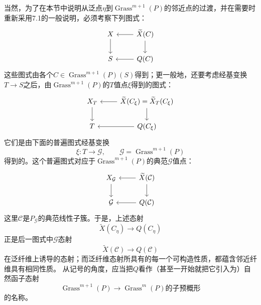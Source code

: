 当然，为了在本节中说明从泛点$\eta$到$\operatorname{Grass}^{m+1}(P)$的邻近点的过渡，并在需要时重新采用7.1的一般说明，必须考察下列图式：
\[
\begin{tikzcd}
X \arrow[d] & \widetilde X(C) \arrow[l] \arrow[d] \\
S & Q(C) \arrow[l]
\end{tikzcd}
\]
这些图式由各个$C\in\operatorname{Grass}^{m+1}(P)(S)$得到；更一般地，还要考虑经基变换$T\to S$之后，由$\operatorname{Grass}^{m+1}(P)$的$T$值点$\xi$得到的图式：
\[
\begin{tikzcd}
X_T \arrow[d] & \widetilde X(C_\xi)=\widetilde X_T(C_\xi) \arrow[l] \arrow[d] \\
T & Q(C_\xi) \arrow[l]
\end{tikzcd}
\]
它们是由下面的普遍图式经基变换
\[
\xi:T\longrightarrow \mathcal G,
\qquad\mathcal G=\operatorname{Grass}^{m+1}(P)
\]
得到的。这个普遍图式对应于$\operatorname{Grass}^{m+1}(P)$的典范$\mathcal G$值点：
\[
\begin{tikzcd}
X_{\mathcal G} \arrow[d] & \widetilde X(\mathcal C) \arrow[l] \arrow[d] \\
\mathcal G & Q(\mathcal C) \arrow[l]
\end{tikzcd}
\]
这里$\mathcal C$是$P_{\mathcal G}$的典范线性子簇。于是，上述态射
\[
\widetilde X(C_\eta)\longrightarrow Q(C_\eta)
\]
正是后一图式中$\mathcal G$态射
\[
\widetilde X(\mathcal C)\longrightarrow Q(\mathcal C)
\]
在泛纤维上诱导的态射；而泛纤维态射所具有的每一个可构造性质，都蕴含邻近纤维具有相同性质。
从记号的角度，应当把$Q$看作（甚至一开始就把它引入为）自然函子态射
\[
\operatorname{Grass}^{m+1}(P)
\longrightarrow
\text{$\operatorname{Grass}^{m}(P)$的子预概形}
\]
的名称。
